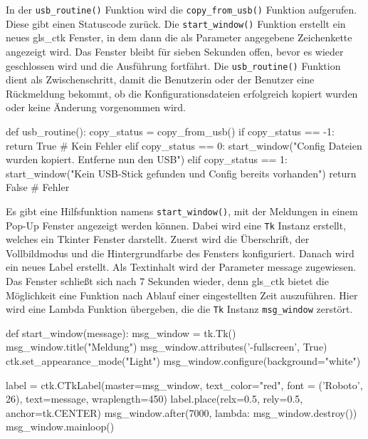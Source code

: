 In der \lstinline{usb_routine()} Funktion wird die \lstinline{copy_from_usb()} Funktion aufgerufen. Diese gibt einen Statuscode zurück. Die \lstinline{start_window()} Funktion erstellt ein neues \gls{gls_ctk} Fenster, in dem dann die als Parameter angegebene Zeichenkette angezeigt wird. Das Fenster bleibt für sieben Sekunden offen, bevor es wieder geschlossen wird und die Ausführung fortfährt. Die \lstinline{usb_routine()} Funktion dient als Zwischenschritt, damit die Benutzerin oder der Benutzer eine Rückmeldung bekommt, ob die Konfigurationsdateien erfolgreich kopiert wurden oder keine Änderung vorgenommen wird.

\begin{pythoncode}
def usb_routine():
	copy_status = copy_from_usb()
	if copy_status == -1:
		return True # Kein Fehler
	elif copy_status == 0:
		start_window("Config Dateien wurden kopiert. Entferne nun den USB")   
	elif copy_status == 1: 
		start_window("Kein USB-Stick gefunden und Config bereits vorhanden")  
	return False # Fehler
\end{pythoncode}

Es gibt eine Hilfsfunktion namens \lstinline{start_window()}, mit der Meldungen in einem Pop-Up Fenster angezeigt werden können. Dabei wird eine \lstinline{Tk} Instanz erstellt, welches ein Tkinter Fenster darstellt. Zuerst wird die Überschrift, der Vollbildmodus und die Hintergrundfarbe des Fensters konfiguriert. Danach wird ein neues Label erstellt. Als Textinhalt wird der Parameter message zugewiesen. Das Fenster schließt sich nach 7 Sekunden wieder, denn \gls{gls_ctk} bietet die Möglichkeit eine Funktion nach Ablauf einer eingestellten Zeit auszuführen. Hier wird eine Lambda Funktion übergeben, die die \lstinline{Tk} Instanz  \lstinline{msg_window} zerstört.
\begin{pythoncode}
def start_window(message):
	msg_window = tk.Tk()
	msg_window.title("Meldung")
	msg_window.attributes('-fullscreen', True)	
	ctk.set_appearance_mode("Light")
	msg_window.configure(background="white")
	
	label = ctk.CTkLabel(master=msg_window, text_color="red", font = ('Roboto', 26), text=message, wraplength=450)
	label.place(relx=0.5, rely=0.5, anchor=tk.CENTER)
	msg_window.after(7000, lambda: msg_window.destroy())
	msg_window.mainloop()
\end{pythoncode}

